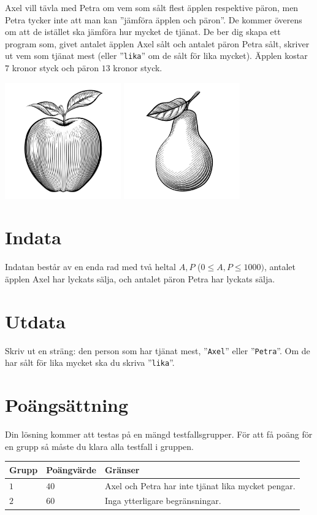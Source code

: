 Axel vill tävla med Petra om vem som sålt flest äpplen respektive päron, men Petra tycker inte att man kan ”jämföra äpplen och päron”.
De kommer överens om att de istället ska jämföra hur mycket de tjänat. De ber dig skapa ett program som, givet antalet äpplen Axel sålt och antalet päron Petra sålt,
skriver ut vem som tjänat mest (eller ”\texttt{lika}” om de sålt för lika mycket). Äpplen kostar $7$ kronor styck och päron $13$ kronor styck.

\begin{center}
  \includegraphics[width=5cm]{apple.jpg}
  \includegraphics[width=5cm]{pear.jpg}
\end{center}

\section*{Indata}
Indatan består av en enda rad med två heltal $A,P$ ($0 \le A,P \le 1000)$, antalet äpplen Axel har lyckats sälja, och antalet päron Petra har lyckats sälja. 

\section*{Utdata}
Skriv ut en sträng: den person som har tjänat mest, ”\texttt{Axel}” eller ”\texttt{Petra}”. Om de har sålt för lika mycket ska du skriva ”\texttt{lika}”.

\section*{Poängsättning}
Din lösning kommer att testas på en mängd testfallsgrupper.
För att få poäng för en grupp så måste du klara alla testfall i gruppen.

\noindent
\begin{tabular}{| l | l | l |}
  \hline
  \textbf{Grupp} & \textbf{Poängvärde} & \textbf{Gränser} \\ \hline
  $1$   & $40$       & Axel och Petra har inte tjänat lika mycket pengar. \\ \hline
  $2$   & $60$       & Inga ytterligare begränsningar. \\ \hline
\end{tabular}
